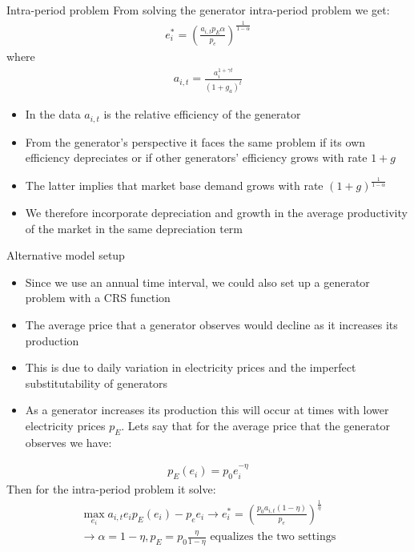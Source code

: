 \documentclass{beamer}
\begin{document}
\begin{frame}{Intra-period problem}\label{intra_period}
\small
    From solving the generator intra-period problem we get:\\
    \begin{align*}
        e_i^* = (\frac{a_{i,t}p_E\alpha}{p_e})^\frac{1}{1-\alpha}
    \end{align*}
    where \begin{align*}
        a_{i,t}=\frac{a_{i}^{1+\gamma t}}{(1+g_a)^t}
    \end{align*}
    \begin{itemize} 
        \item In the data $a_{i,t}$ is the relative efficiency of the generator
        \item From the generator's perspective it faces the same problem if its own efficiency depreciates or if other generators' efficiency grows with rate $1+g$  
        \item The latter implies that market base demand grows with rate $(1+g)^\frac{1}{1-\alpha}$
        \item We therefore incorporate depreciation and growth in the average productivity of the market in the same depreciation term
    \end{itemize}
    
 \hyperlink{gen_problem}{}    
\end{frame}
\begin{frame}{Alternative model setup}\label{alt_model}
\small 
\begin{itemize}
    \item Since we use an annual time interval, we could also set up a generator problem with a CRS function
    \item The average price that a generator observes would decline as it increases its production
    \item This is due to daily variation in electricity prices and the imperfect substitutability of generators
    \item As a generator increases its production this will occur at times with lower electricity prices $p_E$. Lets say that for the average price that the generator observes we have:
\end{itemize}   
    \small\begin{align*}
        p_E(e_i) = p_0e_i^{-\eta}
    \end{align*}
    \small Then for the intra-period problem it solve:
    \small\begin{align*}
        \max_{e_i} a_{i,t}e_ip_E(e_i) - p_ee_i \rightarrow e_i^* = (\frac{p_0a_{i,t}(1-\eta)}{p_e})^\frac{1}{\eta} \\\rightarrow \alpha = 1-\eta , p_E = p_0\frac{\eta}{1-\eta} \text{ equalizes the two settings}
    \end{align*}
    \hyperlink{gen_problem}{}   
\end{frame}
\end{document}
